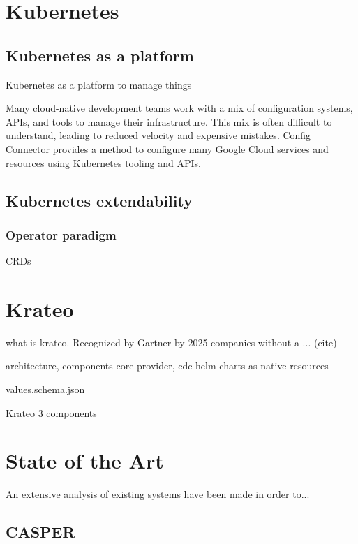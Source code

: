 \section{Kubernetes}


\subsection{Kubernetes as a platform}
Kubernetes as a platform to manage things


Many cloud-native development teams work with a mix of configuration systems, APIs, and tools to manage their infrastructure. This mix is often difficult to understand, leading to reduced velocity and expensive mistakes. Config Connector provides a method to configure many Google Cloud services and resources using Kubernetes tooling and APIs.


\subsection{Kubernetes extendability}

\subsubsection{Operator paradigm}

CRDs

\section{Krateo}
\label{sec:krateo}

what is krateo. Recognized by Gartner
by 2025 companies without a ... (cite)

architecture, components
core provider, cdc
helm charts as native resources

values.schema.json


Krateo 3 components

\section{State of the Art}
An extensive analysis of existing systems have been made in order to...

\subsection{CASPER}

